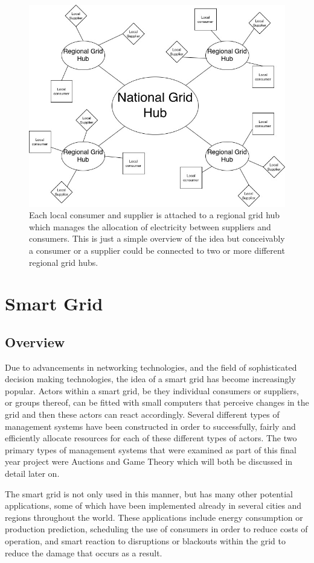 \documentclass[a4paper, notitlepage]{report}
\begin{document}
\begin{figure}[htbp]
\centering
\includegraphics[width=.9\linewidth]{./img/DecentralisedGrid.jpg}
\caption{\label{fig:org7f1fd05}
Each local consumer and supplier is attached to a regional grid hub which manages the allocation of electricity between suppliers and consumers. This is just a simple overview of the idea but conceivably a consumer or a supplier could be connected to two or more different regional grid hubs.}
\end{figure}
\chapter{Smart Grid}
\label{sec:org294730b}
\section{Overview}
\label{sec:org700d5b0}
Due to advancements in networking technologies, and the field of sophisticated
decision making technologies, the idea of a smart grid has become increasingly
popular. Actors within a smart grid, be they individual consumers or suppliers,
or groups thereof, can be fitted with small computers that perceive changes in
the grid and then these actors can react accordingly. Several different types of
management systems have been constructed in order to successfully, fairly and
efficiently allocate resources for each of these different types of actors. The
two primary types of management systems that were examined as part of this final
year project were Auctions and Game Theory which will both be discussed in
detail later on. 

The smart grid is not only used in this manner, but has many other potential
applications, some of which have been implemented already in several cities and
regions throughout the world. These applications include energy consumption or
production prediction, scheduling the use of consumers in order to reduce costs
of operation, and smart reaction to disruptions or blackouts within the grid to
reduce the damage that occurs as a result. 
\end{document}
